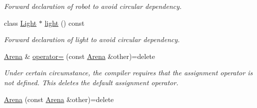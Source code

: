 \begin{DoxyCompactItemize}
\begin{DoxyCompactList}\small\item\em Forward declaration of robot to avoid circular dependency. \end{DoxyCompactList}\item 
class \hyperlink{classLight}{Light} $\ast$ \hyperlink{classArena_aca511be678f7481f7227d81061d66e1d}{light} () const 
\begin{DoxyCompactList}\small\item\em Forward declaration of light to avoid circular dependency. \end{DoxyCompactList}\item 
\hyperlink{classArena}{Arena} \& \hyperlink{classArena_aa977a50aa4a5570a2a553705f1909e9b}{operator=} (const \hyperlink{classArena}{Arena} \&other)=delete\hypertarget{classArena_aa977a50aa4a5570a2a553705f1909e9b}{}\label{classArena_aa977a50aa4a5570a2a553705f1909e9b}

\begin{DoxyCompactList}\small\item\em Under certain circumstance, the compiler requires that the assignment operator is not defined. This {\ttfamily deletes} the default assignment operator. \end{DoxyCompactList}\item 
\hyperlink{classArena_afce6e35e1470823539dc9194bef77499}{Arena} (const \hyperlink{classArena}{Arena} \&other)=delete\hypertarget{classArena_afce6e35e1470823539dc9194bef77499}{}\label{classArena_afce6e35e1470823539dc9194bef77499}


\end{DoxyCompactItemize}
